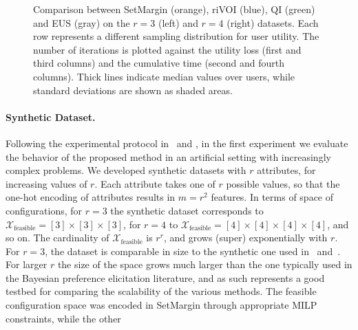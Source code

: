 \documentclass{article}
\renewcommand\[{\begin{equation}}
\renewcommand\]{\end{equation}}
\newcommand{\calvar}[1]{\ensuremath{\mathcal{#1}}}
\newcommand{\calX}{\calvar{X}}
\begin{document}
\begin{figure}[t]
{\begin{tabular}{ccccc}
        \\
    \end{tabular}
    }
    \caption{\label{fig:comparison} Comparison between {\sc SetMargin}
      (orange), {\sc riVOI} (blue), {\sc QI} (green) and {\sc EUS}
      (gray) on the $r=3$ (left) and $r=4$ (right) datasets. Each row
      represents a different sampling distribution for user utility.
      The number of iterations is plotted against the utility loss
      (first and third columns) and the cumulative time (second and
      fourth columns). Thick lines indicate median values over users,
      while standard deviations are shown as shaded areas.}
\end{figure}

\paragraph{Synthetic Dataset.} Following the experimental protocol
in~\cite{guo2010real} and \cite{viappiani2010optimal}, in the first
experiment we evaluate the behavior of the proposed method in an
artificial setting with increasingly complex problems. We developed
synthetic datasets with $r$ attributes, for increasing values of $r$.
Each attribute takes one of $r$ possible values, so that the one-hot
encoding of attributes results in $m=r^2$ features. In terms of space
of configurations, for $r=3$ the synthetic dataset corresponds to 
$\calX_\text{feasible} = [3] \times [3] \times [3]$, for $r=4$ to
$\calX_\text{feasible} = [4] \times [4] \times [4] \times [4]$, and so on. The
cardinality of $\calX_\text{feasible}$ is $r^r$, and grows (super)
exponentially with $r$.
For $r=3$, the dataset is comparable in size to the synthetic one used
in~\cite{guo2010real} and~\cite{viappiani2010optimal}.
For larger $r$ the size of the space grows much larger than the one
typically used in the Bayesian preference elicitation literature, and
as such represents a good testbed for comparing the scalability of the
various methods. The feasible configuration space was encoded in {\sc
  SetMargin} through appropriate MILP constraints, while the other
\end{document}
